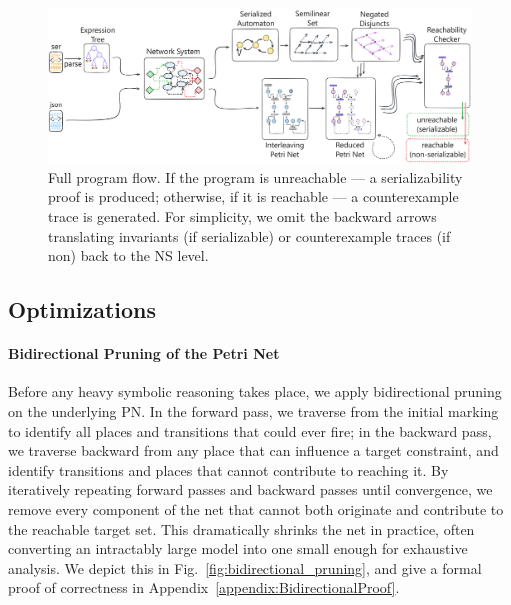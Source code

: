 \begin{figure}[!htbp]
	\centering
	\includegraphics[width=1.0\textwidth]{plots/full_program_flow.pdf}
	\caption{Full program flow. If the program is unreachable --- a serializability proof is produced; otherwise, if it is reachable --- a counterexample trace is generated.
	For simplicity, we omit the backward arrows translating invariants (if serializable) or counterexample traces (if non) back to the NS level.}
	\label{fig:full_program_flow}
\end{figure}


\subsection{Optimizations}

\paragraph{Bidirectional Pruning of the Petri Net}
Before any heavy symbolic reasoning takes place, we apply bidirectional pruning on the underlying PN.  In the forward pass, we traverse from the initial marking to identify all places and transitions that could ever fire; in the backward pass, we traverse backward from any place that can influence a target constraint, and identify transitions and places that cannot contribute to reaching it.  By iteratively repeating forward passes and backward passes until convergence, we remove every component of the net that cannot both originate and contribute to the reachable target set.  This dramatically shrinks the net in practice, often converting an intractably large model into one small enough for exhaustive analysis.
%
We depict this in Fig.~\ref{fig:bidirectional_pruning}, and give a formal proof of correctness in Appendix~\ref{appendix:BidirectionalProof}.

